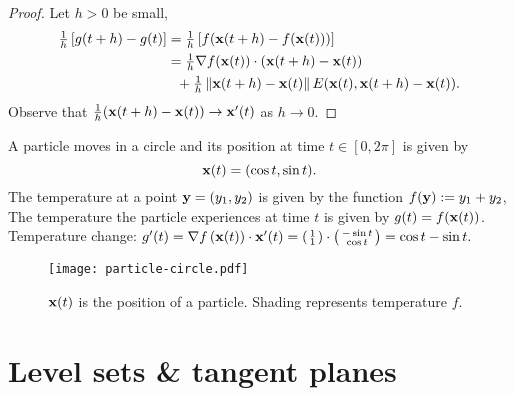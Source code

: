 \begin{proof}
    Let \(h>0\) be small, \vspace{-.5em}
    \[
        \begin{aligned}
            \tfrac{1}{h}\left[g(t+h)-g(t) \right]
             & = \tfrac{1}{h}\left[f(\mathbf{x}(t+h)-f(\mathbf{x}(t)))\right]                        \\
             & = \tfrac{1}{h} \nabla f(\mathbf{x}(t))\cdot (\mathbf{x}(t+h)-\mathbf{x}(t))                  \\
             & \ \ +  \tfrac{1}{h}  \left\|\mathbf{x}(t+h)-\mathbf{x}(t)\right\| E(\mathbf{x}(t), \mathbf{x}(t+h)-\mathbf{x}(t)).
        \end{aligned}
    \]
    Observe that \(\tfrac{1}{h}  (\mathbf{x}(t+h)-\mathbf{x}(t)) \to \mathbf{x}'(t)  \) as \(h\to 0\).
\end{proof}


\begin{example*}
    A particle moves in a circle and its position at time \(t\in [0,2\pi]\) is given by
    \[
        \mathbf{x}(t) = (\cos t, \sin t).
    \]
    The temperature at a point \(\mathbf{y}=(y_1,y_2)\) is given by the function \(f(\mathbf{y}) := y_1 + y_2\),
    The temperature the particle experiences at time \(t\) is given by \(g(t) = f (\mathbf{x}(t))\).
    Temperature change:
    \(
    g'(t)
    = \nabla f \left(\mathbf{x}(t)\right) \cdot \mathbf{x}'(t)
    = \left(\begin{smallmatrix}
            1 \\
            1
        \end{smallmatrix}\right)
    \cdot
    \left( \begin{smallmatrix}
            -\sin t \\
            \cos t
        \end{smallmatrix}\right)
    = \cos t - \sin t.
    \)
\end{example*}

\begin{figure}
    \begin{center}
        \texttt{[image: particle-circle.pdf]}
        \caption{\(\mathbf{x}(t)\) is the position of a particle. Shading represents temperature \(f\).}
        \label{fig:particle-circle}
    \end{center}
\end{figure}


\section{Level sets \& tangent planes}

